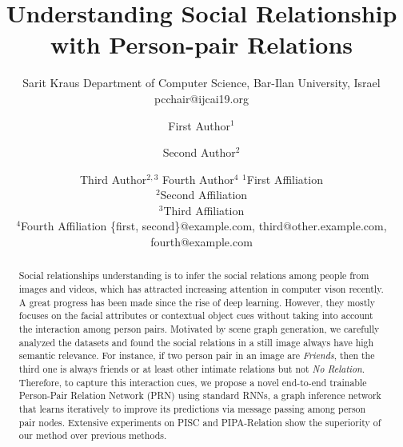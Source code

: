 \documentclass{article}
\title{Understanding Social Relationship with Person-pair Relations}
\author{
    Sarit Kraus
    \affiliations
    Department of Computer Science, Bar-Ilan University, Israel \emails
    pcchair@ijcai19.org
}
\author{
First Author$^1$
\and
Second Author$^2$\and
Third Author$^{2,3}$\And
Fourth Author$^4$
\affiliations
$^1$First Affiliation\\
$^2$Second Affiliation\\
$^3$Third Affiliation\\
$^4$Fourth Affiliation
\emails
\{first, second\}@example.com,
third@other.example.com,
fourth@example.com
}
\newcommand{\PRN}{{\sf PRN}}
\begin{document}
\maketitle

\begin{abstract}

Social relationships understanding is to infer the social relations among people from images and videos, which has attracted increasing attention in computer vison recently. A great progress has been made since the rise of deep learning. However, they mostly focuses on the facial attributes or contextual object cues without taking into account the interaction among person pairs. Motivated by scene graph generation, we carefully analyzed the datasets and found the social relations in a still image always have high semantic relevance. For instance, if two person pair in an image are {\it Friends}, then the third one is always friends or at least other intimate relations but not {\it No Relation}. Therefore, to capture this interaction cues, we propose a novel end-to-end trainable Person-Pair Relation Network (\PRN) using standard RNNs, a graph inference network that learns iteratively to improve its predictions via message passing among person pair nodes. Extensive experiments on PISC and PIPA-Relation show the superiority of our method over previous methods. 

\end{abstract}
\end{document}
